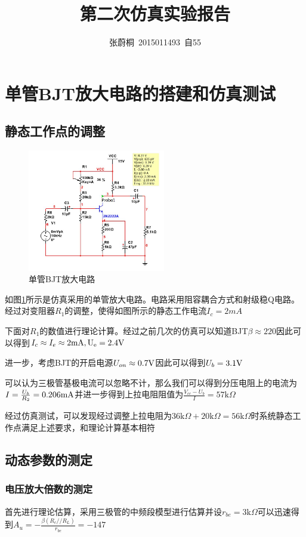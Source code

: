 \documentclass[UTF8,a4paper]{ctexart}
\title{第二次仿真实验报告}
\author{张蔚桐\ 2015011493\ 自55}
\begin{document}
\newcommand{\tabincell}[2]{\begin{tabular}{@{}#1@{}}#2\end{tabular}}
\maketitle
\section{单管BJT放大电路的搭建和仿真测试}
\subsection{静态工作点的调整}
\begin{figure}
\includegraphics[width=60mm]{1-1.jpg}
\caption{单管BJT放大电路}
\label{bjtc}
\end{figure}
如图\ref{bjtc}所示是仿真采用的单管放大电路。电路采用阻容耦合方式和射级稳Q电路。经过对变阻器$R_1$的调整，使得如图所示的静态工作电流$I_c=2mA$

下面对$R_1$的数值进行理论计算。经过之前几次的仿真可以知道BJT$\beta\approx220$因此可以得到$I_c\approx I_e\approx 2\rm{mA},U_e=2.4\rm{V}$

进一步，考虑BJT的开启电源$U_{on}\approx0.7\rm{V}$因此可以得到$U_b=3.1\rm{V}$

可以认为三极管基极电流可以忽略不计，那么我们可以得到分压电阻上的电流为
$I=\frac{U_b}{R_2}=0.206\rm{mA}$并进一步得到上拉电阻阻值为$\frac{V_{cc}-U_{b}}{I}=57\mathrm{k}\Omega$

经过仿真测试，可以发现经过调整上拉电阻为$36\mathrm{k}\Omega+20\mathrm{k}\Omega=56\mathrm{k}\Omega$时系统静态工作点满足上述要求，和理论计算基本相符
\subsection{动态参数的测定}
\subsubsection{电压放大倍数的测定}
首先进行理论估算，采用三极管的中频段模型进行估算并设$r_{be}=3\mathrm{k}\Omega$可以迅速得到$A_u=-\frac{\beta(R_c//R_L)}{r_{be}}=-147$
\end{document}
